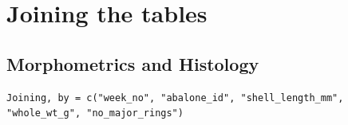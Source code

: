 \documentclass[]{article}
\newenvironment{Shaded}{\begin{snugshade}}{\end{snugshade}}
\newcommand{\CommentTok}[1]{\textcolor[rgb]{0.56,0.35,0.01}{\textit{#1}}}
\newcommand{\DataTypeTok}[1]{\textcolor[rgb]{0.13,0.29,0.53}{#1}}
\newcommand{\KeywordTok}[1]{\textcolor[rgb]{0.13,0.29,0.53}{\textbf{#1}}}
\newcommand{\NormalTok}[1]{#1}
\newcommand{\OperatorTok}[1]{\textcolor[rgb]{0.81,0.36,0.00}{\textbf{#1}}}
\newcommand{\StringTok}[1]{\textcolor[rgb]{0.31,0.60,0.02}{#1}}
\begin{document}
\hypertarget{joining-the-tables}{%
\section{Joining the tables}\label{joining-the-tables}}

\hypertarget{morphometrics-and-histology}{%
\subsection{Morphometrics and
Histology}\label{morphometrics-and-histology}}

\begin{Shaded}
\end{Shaded}

\begin{verbatim}
Joining, by = c("week_no", "abalone_id", "shell_length_mm", "whole_wt_g", "no_major_rings")
\end{verbatim}

\begin{Shaded}
\end{Shaded}
\end{document}
